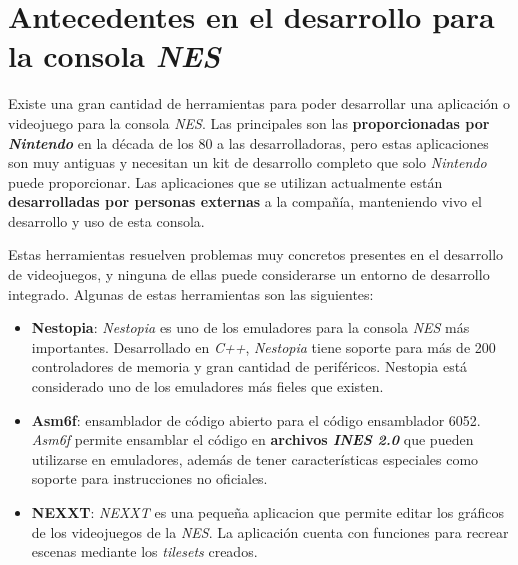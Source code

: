 \section{Antecedentes en el desarrollo para la consola \textit{NES}}
\label{sec:antecedentes-en-el-desarrollo-para-la-consola-nes}

Existe una gran cantidad de herramientas para poder desarrollar
una aplicación o videojuego para la consola \textit{NES}\cite{NES}.
Las principales son las \textbf{proporcionadas por \textit{Nintendo}}
en la década de los 80 a las desarrolladoras, pero estas
aplicaciones son muy antiguas y necesitan un kit de desarrollo
completo que solo \textit{Nintendo} puede proporcionar.
Las aplicaciones que se utilizan actualmente están
\textbf{desarrolladas por personas externas} a la compañía,
manteniendo vivo el desarrollo y uso de esta consola.

Estas herramientas resuelven problemas muy concretos
presentes en el desarrollo de videojuegos, y ninguna
de ellas puede considerarse un entorno de desarrollo integrado.
Algunas de estas herramientas son las siguientes:

\begin{itemize}
    \item \textbf{Nestopia}\cite{NESTOPIA}:
    \textit{Nestopia} es uno de los emuladores
    para la consola \textit{NES} más importantes.
    Desarrollado en \textit{C++}, \textit{Nestopia} tiene soporte
    para más de 200 controladores de memoria y gran cantidad de periféricos.
    Nestopia está considerado uno de los emuladores más
    fieles que existen.
    \item \textbf{Asm6f}\cite{ASM6F}:
    ensamblador de código abierto
    para el código ensamblador 6052.
    \textit{Asm6f} permite ensamblar el código en
    \textbf{archivos \textit{INES 2.0}}
    que pueden utilizarse en emuladores, además
    de tener características especiales como soporte
    para instrucciones no oficiales.
    \item \textbf{NEXXT}: \textit{NEXXT} es una pequeña
    aplicacion que permite editar los gráficos de los
    videojuegos de la \textit{NES}.
    La aplicación cuenta con funciones para recrear escenas
    mediante los \textit{tilesets} creados.
\end{itemize}